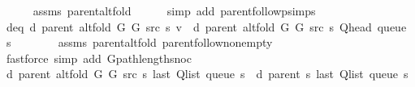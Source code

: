 \begin{isabellebody}
\ \ \ \ \isamarkupfalse%
\ assms{\isacharparenleft}{\kern0pt}{}{\isacharparenright}{\kern0pt}\ parent{\isacharunderscore}{\kern0pt}alt{\isacharunderscore}{\kern0pt}fold\isanewline
\ \ \ \ \isamarkupfalse%
\ {\isacharparenleft}{\kern0pt}simp\ add{\isacharcolon}{\kern0pt}\ parent{\isachardot}{\kern0pt}follow{\isacharunderscore}{\kern0pt}psimps{\isacharparenright}{\kern0pt}\isanewline
\ \ \isamarkupfalse%
\ d{\isacharunderscore}{\kern0pt}eq{\isacharcolon}{\kern0pt}\ {\isachardoublequoteopen}d\ {\isacharparenleft}{\kern0pt}parent\ {\isacharparenleft}{\kern0pt}alt{\isacharunderscore}{\kern0pt}fold\ G{}\ G{}\ src\ s{\isacharparenright}{\kern0pt}{\isacharparenright}{\kern0pt}\ v\ {\isacharequal}{\kern0pt}\ d\ {\isacharparenleft}{\kern0pt}parent\ {\isacharparenleft}{\kern0pt}alt{\isacharunderscore}{\kern0pt}fold\ G{}\ G{}\ src\ s{\isacharparenright}{\kern0pt}{\isacharparenright}{\kern0pt}\ {\isacharparenleft}{\kern0pt}Q{\isacharunderscore}{\kern0pt}head\ {\isacharparenleft}{\kern0pt}queue\ s{\isacharparenright}{\kern0pt}{\isacharparenright}{\kern0pt}\ {\isacharplus}{\kern0pt}\ {}{\isachardoublequoteclose}\isanewline
\ \ \ \ \isamarkupfalse%
\ assms{\isacharparenleft}{\kern0pt}{}{\isacharparenright}{\kern0pt}\ parent{\isacharunderscore}{\kern0pt}alt{\isacharunderscore}{\kern0pt}fold\ parent{\isachardot}{\kern0pt}follow{\isacharunderscore}{\kern0pt}non{\isacharunderscore}{\kern0pt}empty\isanewline
\ \ \ \ \isamarkupfalse%
\ {\isacharparenleft}{\kern0pt}fastforce\ simp\ add{\isacharcolon}{\kern0pt}\ G{\isachardot}{\kern0pt}path{\isacharunderscore}{\kern0pt}length{\isacharunderscore}{\kern0pt}snoc{\isacharparenright}{\kern0pt}\isanewline
\isanewline
\ \ \isamarkupfalse%
\ {\isachardoublequoteopen}d\ {\isacharparenleft}{\kern0pt}parent\ {\isacharparenleft}{\kern0pt}alt{\isacharunderscore}{\kern0pt}fold\ G{}\ G{}\ src\ s{\isacharparenright}{\kern0pt}{\isacharparenright}{\kern0pt}\ {\isacharparenleft}{\kern0pt}last\ {\isacharparenleft}{\kern0pt}Q{\isacharunderscore}{\kern0pt}list\ {\isacharparenleft}{\kern0pt}queue\ s{\isacharparenright}{\kern0pt}{\isacharparenright}{\kern0pt}{\isacharparenright}{\kern0pt}\ {\isacharequal}{\kern0pt}\ d\ {\isacharparenleft}{\kern0pt}parent\ s{\isacharparenright}{\kern0pt}\ {\isacharparenleft}{\kern0pt}last\ {\isacharparenleft}{\kern0pt}Q{\isacharunderscore}{\kern0pt}list\ {\isacharparenleft}{\kern0pt}queue\ s{\isacharparenright}{\kern0pt}{\isacharparenright}{\kern0pt}{\isacharparenright}{\kern0pt}{\isachardoublequoteclose}\isanewline

\end{isabellebody}
